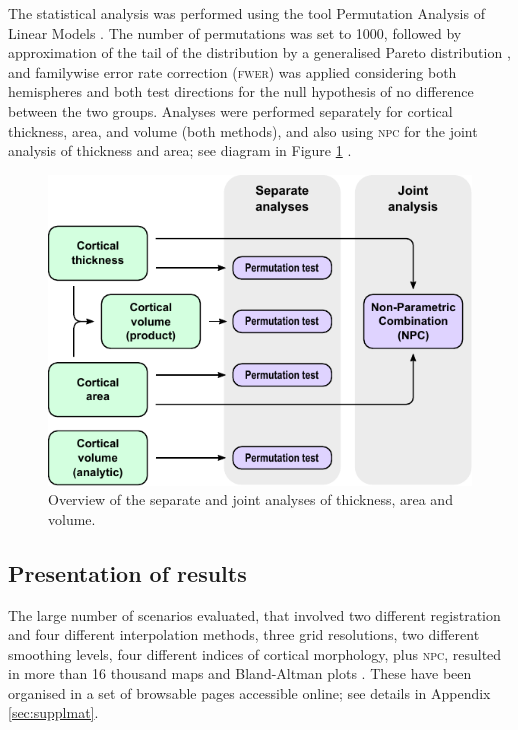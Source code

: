 The statistical analysis was performed using the tool Permutation Analysis of Linear Models \citep[\textsc{palm}; ][see also Section~\ref{sec:conclusion:palm}]{Winkler2014, Winkler2016_npc}. The number of permutations was set to 1000, followed by approximation of the tail of the distribution by a generalised Pareto distribution \citep[\textsc{gpd}; ][see also Chapter \ref{sec:accel}]{Winkler2016_fast}, and familywise error rate correction (\textsc{fwer}) was applied considering both hemispheres and both test directions for the null hypothesis of no difference between the two groups. Analyses were performed separately for cortical thickness, area, and volume (both methods), and also using \textsc{npc} for the joint analysis of thickness and area; see diagram in Figure \ref{fig:flowstats}	.

\begin{figure}[!tp]
\begin{center}
\includegraphics{figures/flowstats.pdf}
\caption[Overview of the separate and joint analyses of thickness, area and volume.]{Overview of the separate and joint analyses of thickness, area and volume.}
\label{fig:flowstats}
\end{center}
\end{figure}

\subsection{Presentation of results}

The large number of scenarios evaluated, that involved two different registration and four different interpolation methods, three grid resolutions, two different smoothing levels, four different indices of cortical morphology, plus \textsc{npc}, resulted in more than 16 thousand maps and Bland-Altman plots \citep{Bland1986}. These have been organised in a set of browsable pages accessible online; see details in Appendix \ref{sec:supplmat}.

